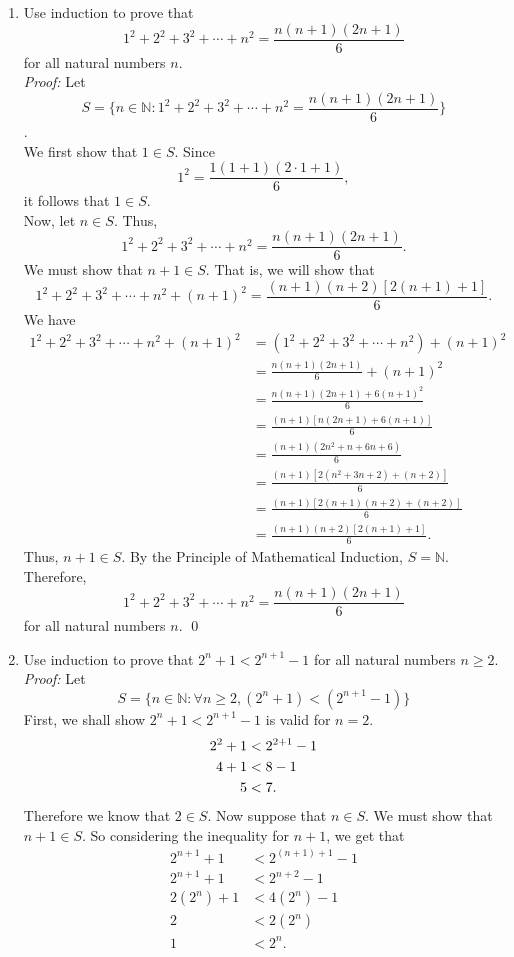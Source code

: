 \documentclass[12pt]{article}
\begin{document}
\begin{enumerate}
\begin{enumerate}
	\emph{Proof/Explanation.} \\
	It has been proven that $S = \varnothing$. \qed \\
	\end{enumerate}


\item Use induction to prove that
\[1^2 + 2^2 + 3^2 + \dotsb + n^2 = \frac{n(n+1)(2n+1)}{6}\]
for all natural numbers $n$.\\
\textit{Proof:} Let 
\[ S = \bigg \{n \in \mathbb{N}:1^2 + 2^2 + 3^2 + \dotsb + n^2 = \frac{n(n+1)(2n+1)}{6} \bigg \} \] .\\
We first show that $1 \in S$. Since
\[1^2 = \frac{1(1+1)(2\cdot 1+1)}{6},\]
it follows that $1 \in S$.\\
Now, let $n \in S$. Thus,
\[1^2 + 2^2 + 3^2 + \dotsb + n^2 = \frac{n(n+1)(2n+1)}{6}.\]
We must show that $n+1 \in S$. That is, we will show that
\[1^2 + 2^2 + 3^2 + \dotsb + n^2 +(n+1)^2 = \frac{(n+1)(n+2)[2(n+1)+1]}{6}.\]
We have
\begin{align*}
    1^2 + 2^2 + 3^2 + \dotsb + n^2 +(n+1)^2 &= (1^2 + 2^2 + 3^2 + \dotsb + n^2) +(n+1)^2\\
    &= \frac{n(n+1)(2n+1)}{6} +(n+1)^2\\
    &= \frac{n(n+1)(2n+1) + 6(n+1)^2}{6}\\
    &= \frac{(n+1)[n(2n+1)+6(n+1)]}{6}\\
    &= \frac{(n+1)(2n^2+n+6n+6)}{6}\\
    &= \frac{(n+1)[2(n^2 + 3n +2)+(n+2)]}{6}\\
    &= \frac{(n+1)[2(n+1)(n+2) + (n+2)]}{6}\\
    &= \frac{(n+1)(n+2)[2(n+1)+1]}{6}.
\end{align*}
Thus, $n+1 \in S$. By the Principle of Mathematical Induction, $S=\mathbb{N}$.\\ Therefore, \[1^2 + 2^2 + 3^2 + \dotsb + n^2 = \frac{n(n+1)(2n+1)}{6}\]
for all natural numbers $n$. \qed \\


\item Use induction to prove that $2^n + 1 < 2^{n+1} - 1$ for all natural numbers $n \geq 2$.
\emph{Proof: }
 Let \[ S = \bigg \{n \in \mathbb{N}:\forall{n} \geq2,   (2^n + 1) < (2^{n+1} - 1) \bigg \} \]
First, we shall show $2^n + 1 < 2^{n+1} - 1$ is valid for $n=2$.
\begin{align}
    2^2+1&<2^{2+1}-1\notag\\
    4+1&<8-1\notag\\
    5&<7.\notag
\end{align}
Therefore we know that $2 \in S$.  Now suppose that $n \in S$.  We must show that $n+1 \in S$. So considering the inequality for $n+1$, we get that
\begin{align*}
    2^{n+1}+1 &< 2^{(n+1)+1}-1\\
    2^{n+1} +1 &< 2^{n+2}-1\\
    2(2^n)+1 &< 4(2^n)-1\\
    2 &< 2(2^n)\\
    1 &< 2^n.
\end{align*}


\end{enumerate}
\end{document}
